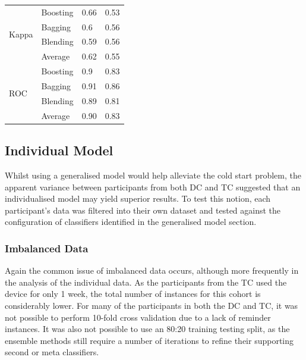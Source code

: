 \begin{table}[h]
\begin{tabular}{@{}llll@{}}
\multirow{4}{*}{Kappa}     & Boosting   & 0.66                & 0.53                  \\
                           & Bagging    & 0.6                 & 0.56                  \\
                           & Blending   & 0.59                & 0.56                  \\
                           & Average    & 0.62                & 0.55                  \\ \midrule
\multirow{4}{*}{ROC}       & Boosting   & 0.9                 & 0.83                  \\
                           & Bagging    & 0.91                & 0.86                  \\
                           & Blending   & 0.89                & 0.81                  \\
                           & Average    & 0.90                & 0.83                  \\ \bottomrule
\end{tabular}
\end{table}


\subsection{Individual Model}
Whilst using a generalised model would help alleviate the cold start problem, the apparent variance between participants from both DC and TC suggested that an individualised model may yield superior results. To test this notion, each participant's data was filtered into their own dataset and tested against the configuration of classifiers identified in the generalised model section.

\subsubsection{Imbalanced Data}
Again the common issue of imbalanced data occurs, although more frequently in the analysis of the individual data. As the participants from the TC used the device for only 1 week, the total number of instances for this cohort is considerably lower. 
For many of the participants in both the DC and TC, it was not possible to perform 10-fold cross validation due to a lack of reminder instances. It was also not possible to use an 80:20 training testing split, as the ensemble methods still require a number of iterations to refine their supporting second or meta classifiers.

